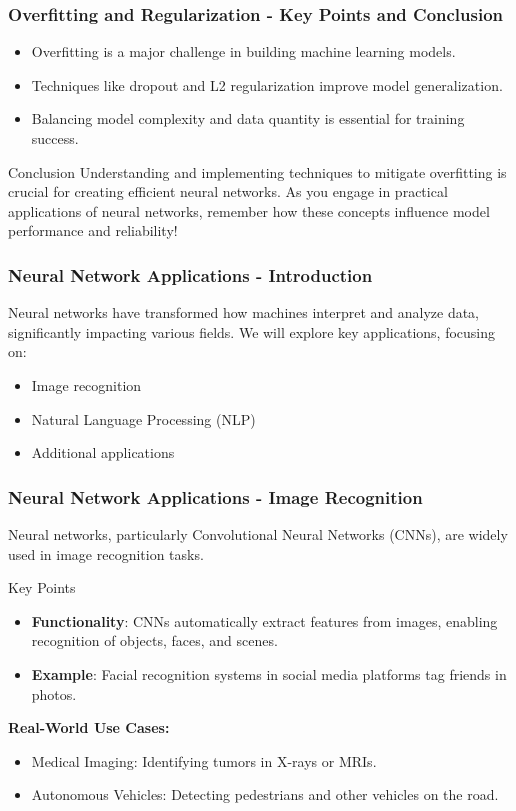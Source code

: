 \documentclass[aspectratio=169]{beamer}
\begin{document}
\begin{frame}[fragile]
    \frametitle{Overfitting and Regularization - Key Points and Conclusion}
    \begin{itemize}
        \item Overfitting is a major challenge in building machine learning models.
        \item Techniques like dropout and L2 regularization improve model generalization.
        \item Balancing model complexity and data quantity is essential for training success.
    \end{itemize}
    
    \begin{block}{Conclusion}
        Understanding and implementing techniques to mitigate overfitting is crucial for creating efficient neural networks. As you engage in practical applications of neural networks, remember how these concepts influence model performance and reliability!
    \end{block}
\end{frame}

\begin{frame}[fragile]
    \frametitle{Neural Network Applications - Introduction}
    Neural networks have transformed how machines interpret and analyze data, significantly impacting various fields. 
    We will explore key applications, focusing on:
    \begin{itemize}
        \item Image recognition
        \item Natural Language Processing (NLP)
        \item Additional applications
    \end{itemize}
\end{frame}

\begin{frame}[fragile]
    \frametitle{Neural Network Applications - Image Recognition}
    Neural networks, particularly Convolutional Neural Networks (CNNs), are widely used in image recognition tasks.
    
    \begin{block}{Key Points}
        \begin{itemize}
            \item \textbf{Functionality}: CNNs automatically extract features from images, enabling recognition of objects, faces, and scenes.
            \item \textbf{Example}: Facial recognition systems in social media platforms tag friends in photos.
        \end{itemize}
    \end{block}

    \textbf{Real-World Use Cases:}
    \begin{itemize}
        \item Medical Imaging: Identifying tumors in X-rays or MRIs.
        \item Autonomous Vehicles: Detecting pedestrians and other vehicles on the road.
    \end{itemize}
\end{frame}
\end{document}
